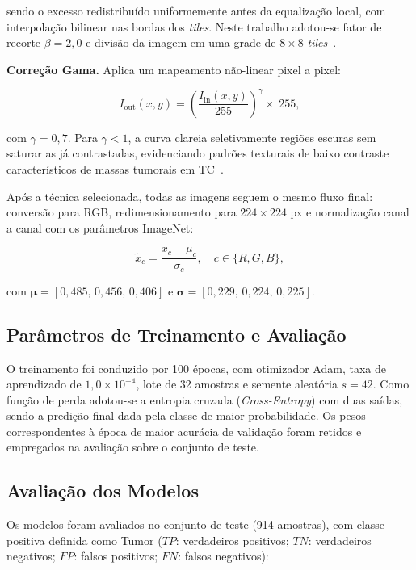 \documentclass[conference]{IEEEtran}
\begin{document}
\noindent sendo o excesso redistribuído uniformemente antes da equalização
local, com interpolação bilinear nas bordas dos \textit{tiles}. Neste trabalho
adotou-se fator de recorte $\beta{=}2{,}0$ e divisão da imagem em uma grade de
$8{\times}8$ \textit{tiles}~\cite{clahe}.

\textbf{Correção Gama.} Aplica um mapeamento não-linear pixel a pixel:

\begin{equation}
    I_{\text{out}}(x,y) = \left(\frac{I_{\text{in}}(x,y)}{255}\right)^{\!\gamma}
    \!\times\; 255,
    \label{eq:gamma}
\end{equation}

\noindent com $\gamma{=}0{,}7$. Para $\gamma{<}1$, a curva clareia
seletivamente regiões escuras sem saturar as já contrastadas, evidenciando
padrões texturais de baixo contraste característicos de massas tumorais em
TC~\cite{gonzalez2018}.

Após a técnica selecionada, todas as imagens seguem o mesmo fluxo final:
conversão para RGB, redimensionamento para $224{\times}224$ px e normalização
canal a canal com os parâmetros ImageNet:

\begin{equation}
    \tilde{x}_c = \frac{x_c - \mu_c}{\sigma_c},\quad c\in\{R,G,B\},
    \label{eq:norm}
\end{equation}

\noindent com $\boldsymbol{\mu}{=}[0{,}485,\,0{,}456,\,0{,}406]$ e
$\boldsymbol{\sigma}{=}[0{,}229,\,0{,}224,\,0{,}225]$.

\subsection{Parâmetros de Treinamento e Avaliação}

O treinamento foi conduzido por 100 épocas, com otimizador Adam, taxa de
aprendizado de $1{,}0\times10^{-4}$, lote de 32 amostras e semente aleatória
$s{=}42$. Como função de perda adotou-se a entropia cruzada
(\textit{Cross-Entropy}) com duas saídas, sendo a predição final dada pela
classe de maior probabilidade. Os pesos correspondentes à época de maior
acurácia de validação foram retidos e empregados na avaliação sobre o
conjunto de teste.

\subsection{Avaliação dos Modelos}

Os modelos foram avaliados no conjunto de teste (914 amostras), com classe
positiva definida como Tumor ($TP$: verdadeiros positivos; $TN$: verdadeiros
negativos; $FP$: falsos positivos; $FN$: falsos negativos):
\end{document}
